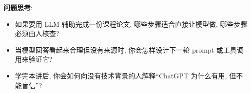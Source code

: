 \documentclass{../nndlcourse}
\begin{document}
\textbf{问题思考}:
\begin{itemize}
  \item 如果要用 LLM 辅助完成一份课程论文, 哪些步骤适合直接让模型做, 哪些步骤必须由人核查?
  \item 当模型回答看起来合理但没有来源时, 你会怎样设计下一轮 prompt 或工具调用来验证它?
  \item 学完本讲后, 你会如何向没有技术背景的人解释“ChatGPT 为什么有用, 但不能盲信”?
\end{itemize}
\end{document}
